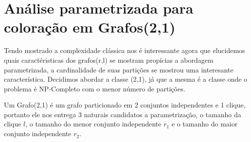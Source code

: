\chapter{Análise parametrizada para coloração em Grafos(2,1)}
Tendo mostrado a complexidade clássica nos é interessante agora que elucidemos quais caractéristicas dos grafos(r,l) se mostram propícias a abordagem parametrizada, a cardinalidade de suas partições se mostrou uma interesante característica.
Decidimos abordar a classe (2,1), já que a mesma é a classe onde o problema é NP-Completo com o menor número de partições.

Um Grafo(2,1) é um grafo particionado em 2 conjuntos independentes e 1 clique, portanto ele nos entrega 3 naturais candidatos a parametrização, o tamanho da clique $l$, o tamanho do menor conjunto independente $r_1$ e o tamanho do maior conjunto independente $r_2$.

